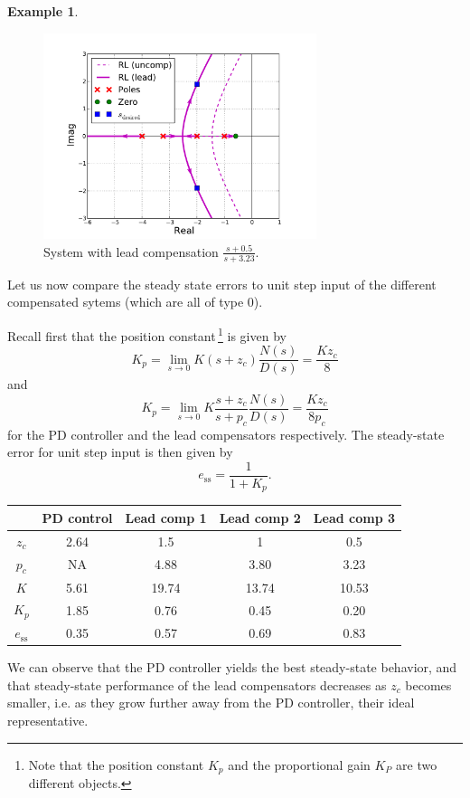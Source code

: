 \documentclass[a4paper,11pt]{report}
\theoremstyle{definition}
\newcommand{\sse}{\mathrm{ss}}
\newtheorem{mdexample}{Example}
\newenvironment{example}%
  {\vspace{0.1cm}\begin{mdframed}[backgroundcolor=lightgray]\begin{mdexample}}%
  {\end{mdexample}\end{mdframed}\vspace{0.1cm}}
\begin{document}
\begin{example}
  \begin{figure}[H]
    \centering
    \includegraphics[width=8cm]{fig/design-lead05.pdf}
    \caption{System with lead compensation $\frac{s+0.5}{s+3.23}$.}
    \label{fig:design-lead05}
  \end{figure}

  Let us now compare the steady state errors to unit step input of the
  different compensated sytems (which are all of type 0).

  Recall first that the position constant\,\footnote{Note that the
    position constant $K_p$ and the proportional gain $K_P$ are two
    different objects.} is given by
  \[
  K_p = \lim_{s\to 0} K(s+z_c)\frac{N(s)}{D(s)} = \frac{Kz_c}{8}
  \]
  and
  \[
  K_p = \lim_{s\to 0} K\frac{s+z_c}{s+p_c}\frac{N(s)}{D(s)} = \frac{Kz_c}{8p_c}
  \]
  for the PD controller and the lead compensators respectively. The
  steady-state error for unit step input is then given by
  \[
  e_\sse = \frac{1}{1+K_p}.
  \]

  \vspace{0.2cm}

  \begin{tabular}{|c|c|c|c|c|}
    \hline
    &PD control&Lead comp 1&Lead comp 2&Lead comp 3\\\hline
    $z_c$&2.64&1.5&1&0.5\\\hline      
    $p_c$&NA&4.88&3.80&3.23\\\hline      
    $K$&5.61&19.74&13.74&10.53\\\hline      
    $K_p$&1.85&0.76&0.45&0.20\\\hline      
    $e_\sse$&0.35&0.57&0.69&0.83\\\hline      
  \end{tabular}

  \vspace{0.2cm}

  We can observe that the PD controller yields the best steady-state
  behavior, and that steady-state performance of the lead compensators
  decreases as $z_c$ becomes smaller, i.e. as they grow further away
  from the PD controller, their ideal representative.


\end{example}
\end{document}
